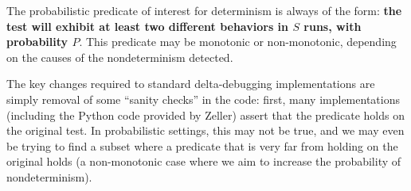 The probabilistic predicate of interest for determinism is always of
the form:  {\bf the test will exhibit at least two different behaviors in $S$
runs, with probability $P$}.  This predicate may be monotonic or
non-monotonic, depending on the causes of the nondeterminism detected.

The key changes required to standard delta-debugging implementations
are simply removal of some ``sanity checks'' in the code:  first, many
implementations (including the Python code provided by Zeller) assert
that the predicate holds on the original test.  In probabilistic
settings, this may not be true, and we may even be trying to find a
subset where a predicate that is very far from holding on the original
holds (a non-monotonic case where we aim to increase the probability
of nondeterminism).